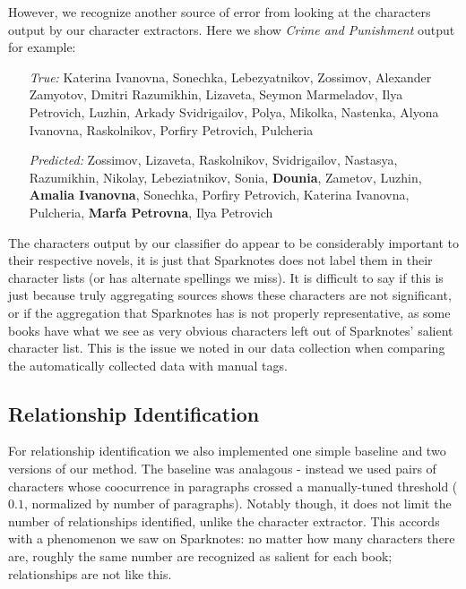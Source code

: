 \documentclass[12pt]{article}
\begin{document}
        However, we recognize another source of error from looking at the characters output by our
        character extractors. Here we show \emph{Crime and Punishment} output for example:
    
        \begin{itemize}
            \item[\emph{True:}]
                Katerina Ivanovna, Sonechka, Lebezyatnikov, Zossimov, Alexander Zamyotov, Dmitri Razumikhin, Lizaveta, Seymon Marmeladov, Ilya Petrovich, Luzhin, Arkady Svidrigailov, Polya, Mikolka, Nastenka, Alyona Ivanovna, Raskolnikov, Porfiry Petrovich, Pulcheria
            \item[\emph{Predicted:}]
                Zossimov, Lizaveta, Raskolnikov, Svidrigailov, Nastasya, Razumikhin, Nikolay, Lebeziatnikov, Sonia, \textbf{Dounia}, Zametov, Luzhin, \textbf{Amalia Ivanovna}, Sonechka, Porfiry Petrovich, Katerina Ivanovna, Pulcheria, \textbf{Marfa Petrovna}, Ilya Petrovich 
        \end{itemize}

        The characters output by our classifier do appear to be considerably important to their
        respective novels, it is just that Sparknotes does not label them in their character lists (or has alternate spellings we miss).
        It is difficult to say if this is just because truly aggregating sources shows these
        characters are not significant, or if the aggregation that Sparknotes has is not properly
        representative, as some books have what we see as very obvious characters left
        out of Sparknotes' salient character list. This is the issue we noted in our data
        collection when comparing the automatically collected data with manual tags. 

    \subsection{Relationship Identification}

        For relationship identification we also implemented one simple baseline and two versions of our method.
        The baseline was analagous - instead we used pairs of characters whose coocurrence in paragraphs crossed 
        a manually-tuned threshold ($0.1$, normalized by number of paragraphs). Notably though, it does not
        limit the number of relationships identified, unlike the character extractor. This accords with a
        phenomenon we saw on Sparknotes: no matter how many characters there are, roughly the same number
        are recognized as salient for each book; relationships are not like this. \\
\end{document}
